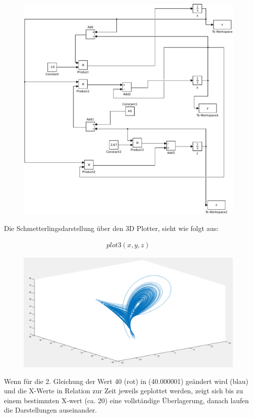 \documentclass[10pt,a4paper]{article}
\begin{document}
\begin{figure}[H]
\centering
\includegraphics[width=0.9\linewidth]{../screenshots/3}
\end{figure}

Die Schmetterlingsdarstellung über den 3D Plotter, sieht wie folgt aus:

\begin{align}
plot3(x,y,z)
\end{align}
\begin{figure}[H]
\centering
\includegraphics[width=0.9\linewidth]{../screenshots/lorenz_matlab.png}
\end{figure}

Wenn für die 2. Gleichung der Wert 40 (rot) in (40.000001) geändert wird (blau) und
die X-Werte in Relation zur Zeit jeweils geplottet werden, zeigt sich bis zu einem bestimmten X-wert (ca. 20) eine vollständige Überlagerung, danach laufen die Darstellungen  auseinander.
\end{document}
